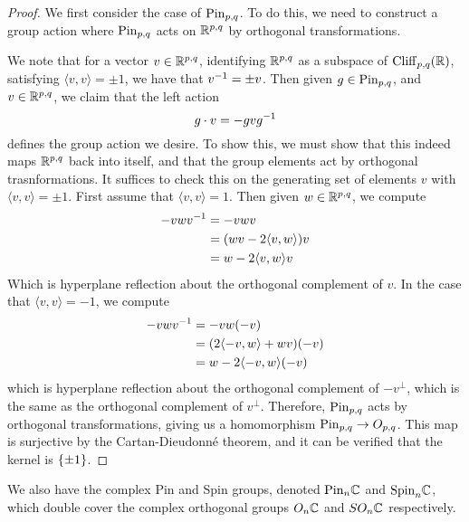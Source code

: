 \begin{proof}
We first consider the case of $\mathrm{Pin}_{p,q}$. To do this, we need to construct
a group action where $\mathrm{Pin}_{p,q}$ acts on $\mathbb{R}^{p,q}$ by orthogonal transformations.
\iffalse
There exists an involution $T : \Cliff_{p,q}(\R) \to \Cliff_{p,q}(\R)$, where given
the standard orthogonal basis $\set{e_1, \ldots, e_{p+1}}$, we define
\[
T(e_{i_1}\cdots e_{i_k}) = e_{i_k}\cdots e_{i_1}
\]
and extending linearly to the remainder of $\Cliff_{p,q}(\R)$. Given $a \in
\Cliff_{p,q}(\R)$, we denote $T(a)$ by $a^T$.
\fi
We note that for a vector
$v \in \mathbb{R}^{p,q}$, identifying $\mathbb{R}^{p,q}$ as a subspace of $\Cliff_{p,q}(\R)$,
satisfying $\langle v,v \rangle = \pm 1$, we have that
$v^{-1} = \pm v$. Then given $g \in \mathrm{Pin}_{p,q}$, and $v \in \mathbb{R}^{p,q}$, we claim
that the left action
\[
g \cdot v = -gvg^{-1}
\]
defines the group action we desire. To show this, we must show that this indeed
maps $\mathbb{R}^{p,q}$ back into itself, and that the group elements act by orthogonal
trasnformations. It suffices to check this on the generating set of elements
$v$ with $\langle v,v \rangle = \pm 1$. First assume that $\langle v,v \rangle = 1$.
Then given $w \in \mathbb{R}^{p,q}$, we compute
%
\begin{align*}
-vwv^{-1} &= -vwv \\
&= (wv - 2\langle v,w \rangle)v \\
&= w - 2\langle v,w \rangle v
\end{align*}
%
Which is hyperplane reflection about the orthogonal complement of $v$. In the
case that $\langle v,v \rangle = -1$, we compute
%
\begin{align*}
-vwv^{-1} &= -vw(-v) \\
&= (2\langle -v,w\rangle + wv)(-v) \\
&= w - 2\langle -v,w \rangle(-v)
\end{align*}
which is hyperplane reflection about the orthogonal complement of $-v^\perp$,
which is the same as the orthogonal complement of $v^\perp$. Therefore,
$\mathrm{Pin}_{p,q}$ acts by orthogonal transformations, giving us a homomorphism
$\mathrm{Pin}_{p,q} \to O_{p,q}$. This map is surjective by the Cartan-Dieudonn\'e
theorem, and it can be verified that the kernel is $\left\lbrace \pm 1 \right\rbrace$.
%
\end{proof}
%
We also have the complex Pin and Spin groups, denoted $\mathrm{Pin}_n\mathbb{C}$ and $\mathrm{Spin}_n\mathbb{C}$,
which double cover the complex orthogonal groups $O_n\mathbb{C}$ and $SO_n\mathbb{C}$
respectively.\\


